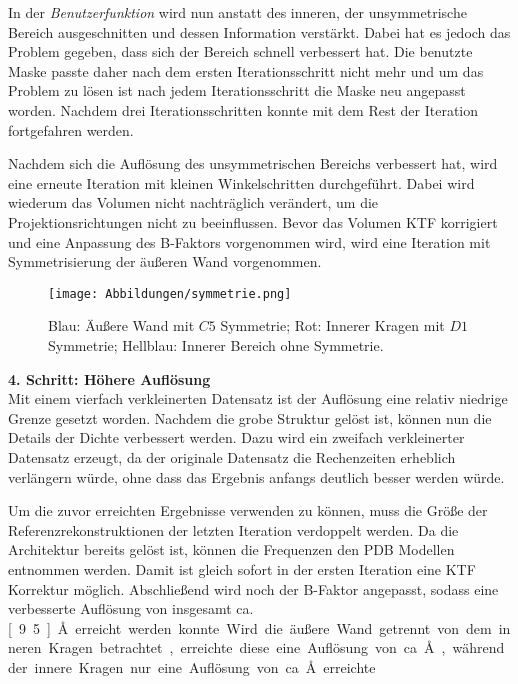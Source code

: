 In der \textit{Benutzerfunktion} wird nun anstatt des inneren, der unsymmetrische Bereich ausgeschnitten und dessen Information verstärkt.
Dabei hat es jedoch das Problem gegeben, dass sich der Bereich schnell verbessert hat. 
Die benutzte Maske passte daher nach dem ersten Iterationsschritt nicht mehr und um das Problem zu lösen ist nach jedem Iterationsschritt die Maske neu angepasst worden.
Nachdem drei Iterationsschritten konnte mit dem Rest der Iteration fortgefahren werden.

Nachdem sich die Auflösung des unsymmetrischen Bereichs verbessert hat, wird eine erneute Iteration mit kleinen Winkelschritten durchgeführt.
Dabei wird wiederum das Volumen nicht nachträglich verändert, um die Projektionsrichtungen nicht zu beeinflussen.
Bevor das Volumen KTF korrigiert und eine Anpassung des B-Faktors vorgenommen wird, wird eine Iteration mit Symmetrisierung der äußeren Wand vorgenommen.
\\
\begin{wrapfigure}{r}{0.2\textwidth}
	\centering
	\texttt{[image: Abbildungen/symmetrie.png]}
	\caption[Trennung des Proteins in Bereiche mit verschiedenen Symmetrien]{Blau: Äußere Wand mit $C5$ Symmetrie; Rot: Innerer Kragen mit $D1$ Symmetrie; Hellblau: Innerer Bereich ohne Symmetrie.}
	\label{sym}
\end{wrapfigure}
\textbf{4. Schritt: Höhere Auflösung}\\
Mit einem vierfach verkleinerten Datensatz ist der Auflösung eine relativ niedrige Grenze gesetzt worden.
Nachdem die grobe Struktur gelöst ist, können nun die Details der Dichte verbessert werden.
Dazu wird ein zweifach verkleinerter Datensatz erzeugt, da der originale Datensatz die Rechenzeiten erheblich verlängern würde, ohne dass das Ergebnis anfangs deutlich besser werden würde.

Um die zuvor erreichten Ergebnisse verwenden zu können, muss die Größe der Referenzrekonstruktionen der letzten Iteration verdoppelt werden.
Da die Architektur bereits gelöst ist, können die Frequenzen den PDB Modellen entnommen werden.
Damit ist gleich sofort in der ersten Iteration eine KTF Korrektur möglich.
Abschließend wird noch der B-Faktor angepasst, sodass eine verbesserte Auflösung von insgesamt ca. \unit[9.5]{\AA} erreicht werden konnte.
Wird die äußere Wand getrennt von dem inneren Kragen betrachtet, erreichte diese eine Auflösung von ca. \unit[8]{\AA}, während der innere Kragen nur eine Auflösung von ca. \unit[10]{\AA} erreichte.
\FloatBarrier 